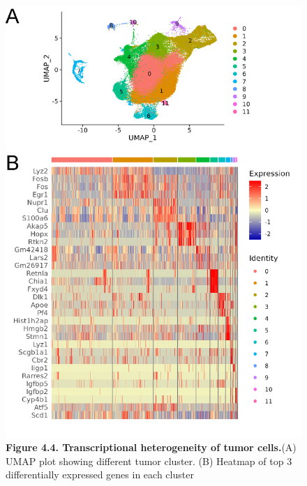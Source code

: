 \begin{figure}
\hypertarget{fig:04}{%
\centering
\includegraphics[width=1\textwidth,height=\textheight]{images/scrna_4.png}
\caption{\textbf{Figure 4.4. Transcriptional heterogeneity of tumor cells.}(A) UMAP plot showing different tumor cluster. (B) Heatmap of top 3 differentially expressed genes in each cluster}\label{fig:04}
}
\end{figure}

